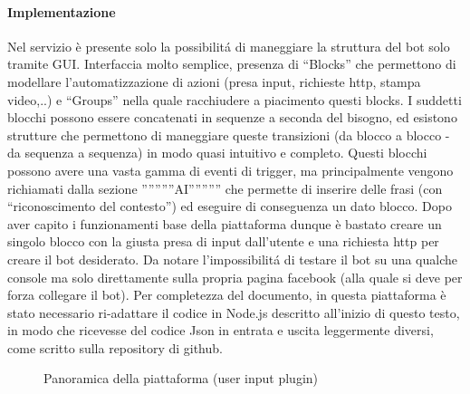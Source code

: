 \documentclass[]{article}
\begin{document}
\paragraph{Implementazione}
Nel servizio è presente solo la possibilitá di maneggiare la struttura del bot solo tramite GUI. Interfaccia molto semplice, presenza di “Blocks” che permettono di modellare l’automatizzazione di azioni (presa input, richieste http, stampa video,..) e “Groups” nella quale racchiudere a piacimento questi blocks. I suddetti blocchi possono essere concatenati in sequenze a seconda del bisogno, ed esistono strutture che permettono di maneggiare queste transizioni (da blocco a blocco - da sequenza a sequenza) in modo quasi intuitivo e completo. Questi blocchi possono avere una vasta gamma di eventi di trigger, ma principalmente vengono richiamati dalla sezione ”””””AI””””” che permette di inserire delle frasi (con “riconoscimento del contesto”)  ed eseguire di conseguenza un dato blocco. Dopo aver capito i funzionamenti base della piattaforma dunque è bastato creare un singolo blocco con la giusta presa di input dall’utente e una richiesta http per creare il bot desiderato. Da notare l’impossibilitá di testare il bot su una qualche console ma solo direttamente sulla propria pagina facebook (alla quale si deve per forza collegare il bot). Per completezza del documento, in questa piattaforma è stato necessario ri-adattare il codice in Node.js descritto all’inizio di questo testo, in modo che ricevesse del codice Json in entrata e uscita leggermente diversi, come scritto sulla repository di github.

\begin{figure}
\caption{ \footnotesize{Panoramica della piattaforma (user input plugin)}}
\end{figure}
\end{document}
